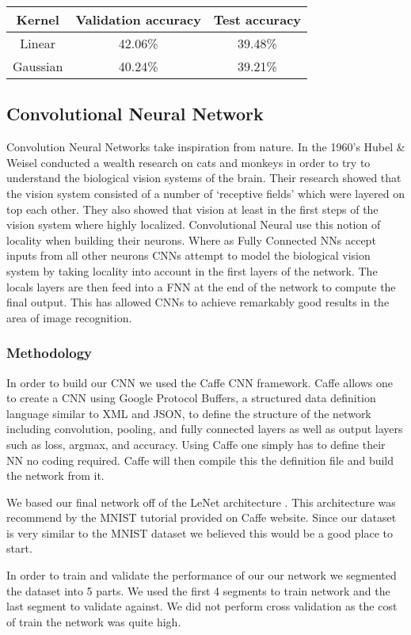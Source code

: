 \documentclass[10pt,twocolumn]{article}
\begin{document}
\begin{tabular}{|c|c|c|}
\hline
Kernel & Validation accuracy & Test accuracy \\ \hline
Linear & 42.06\% & 39.48\% \\
Gaussian & 40.24\% & 39.21\% \\
\hline
\end{tabular}


\subsection{Convolutional Neural Network}
Convolution Neural Networks take inspiration from nature. In the 1960's Hubel \& Weisel conducted a wealth research on cats and monkeys in order to try to understand the biological vision systems of the brain. Their research showed that the vision system consisted of a number of `receptive fields' which were layered on top each other. They also showed that vision at least in the first steps of the vision system where highly localized. Convolutional Neural use this notion of locality when building their neurons. Where as Fully Connected NNs accept inputs from all other neurons CNNs attempt to model the biological vision system by taking locality into account in the first layers of the network. The locals layers are then feed into a FNN at the end of the network to compute the final output. This has allowed CNNs to achieve remarkably good results in the area of image recognition. 
\subsubsection{Methodology}
In order to build our CNN we used the Caffe \cite{jia2014caffe} CNN framework. Caffe allows one to create a CNN using Google Protocol Buffers, a structured data definition language similar to XML and JSON, to define the structure of the network including convolution, pooling, and fully connected layers as well as output layers such as loss, argmax, and accuracy. Using Caffe one simply has to define their NN no coding required. Caffe will then compile this the definition file and build the network from it.

We based our final network off of the LeNet architecture \cite{leCunnGradient}. This architecture was recommend by the MNIST tutorial provided on Caffe website. Since our dataset is very similar to the MNIST dataset we believed this would be a good place to start. 

In order to train and validate the performance of our our network we segmented the dataset into 5 parts. We used the first 4 segments to train network and the last segment to validate against. We did not perform cross validation as the cost of train the network was quite high. 
\end{document}
